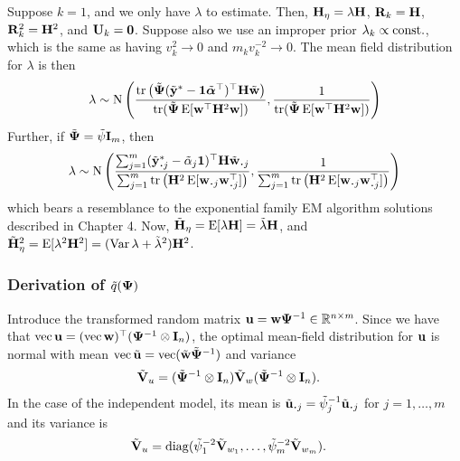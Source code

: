 \begin{example}
  Suppose $k=1$, and we only have $\lambda$ to estimate.
  Then, ${\mathbf H}_\eta = \lambda {\mathbf H}$, ${\mathbf R}_k = {\mathbf H}$, ${\mathbf R}_k^2 = {\mathbf H}^2$, and ${\mathbf U}_k = {\mathbf 0}$.
  Suppose also we use an improper prior $\lambda_k \propto \text{const.}\hspace{0.01em}$, which is the same as having $v_k^2 \to 0$ and $m_k v_k^{-2} \to 0$.
  The mean field distribution for $\lambda$ is then
  \[
    \lambda \sim \operatorname{N} \left( 
    \frac{\operatorname{tr}\big(\tilde{{\bm\Psi}}(\tilde{{\mathbf y}}^* - {\mathbf 1}\tilde{{\bm\alpha}}^\top)^\top {\mathbf H} \tilde{{\mathbf w}} \big)}{\operatorname{tr}(\tilde{{\bm\Psi}}\operatorname{E}[{\mathbf w}^\top{\mathbf H}^2{\mathbf w}])},
    \frac{1}{\operatorname{tr}(\tilde{{\bm\Psi}}\operatorname{E}[{\mathbf w}^\top{\mathbf H}^2{\mathbf w}])}
    \right)
  \]
  Further, if $\tilde{{\bm\Psi}} = \tilde\psi{\mathbf I}_m$, then
  \[
    \lambda \sim \N \left( 
    \frac{\sum_{j=1}^m (\tilde\by^*_{\bigcdot j} - \tilde\alpha_j\bone)^\top \bH \tilde\bw_{\bigcdot j} }{\sum_{j=1}^m
  \tr \big( \bH^2 \E [\bw_{\bigcdot j} \bw_{\bigcdot j}^\top] \big)},
    \frac{1}{\sum_{j=1}^m
  \tr \big( \bH^2 \E [\bw_{\bigcdot j} \bw_{\bigcdot j}^\top] \big)}
    \right)
  \]
  which bears a resemblance to the exponential family EM algorithm solutions described in Chapter 4.
  Now, $\tilde {{\mathbf H}}_\eta = \operatorname{E}[\lambda {\mathbf H}] = \tilde\lambda {\mathbf H}$, and $\tilde {{\mathbf H}}_\eta^2 = \operatorname{E}[\lambda^2 {\mathbf H}^2] = (\operatorname{Var}\lambda + \tilde\lambda^2) {\mathbf H}^2$.
\end{example}

\subsubsection[Derivation of q Psi]{Derivation of $\tilde q({\bm\Psi})$}

Introduce the transformed random matrix ${\mathbf u} = {\mathbf w}{\bm\Psi}^{-1} \in \mathbb{R}^{n\times m}$.
Since we have that  $\operatorname{vec} {\mathbf u} = (\operatorname{vec} {\mathbf w})^\top ({\bm\Psi}^{-1} \otimes {\mathbf I}_n)$, the optimal mean-field distribution for ${\mathbf u}$ is normal with mean $\operatorname{vec} \tilde{{\mathbf u}} = \operatorname{vec} (\tilde{{\mathbf w}}\tilde{{\bm\Psi}}^{-1} )$ and variance
\begin{align*}
  \tilde {{\mathbf V}}_u
  &= (\tilde{{\bm\Psi}}^{-1} \otimes {\mathbf I}_n) \tilde {{\mathbf V}}_w (\tilde{{\bm\Psi}}^{-1} \otimes {\mathbf I}_n). 
\end{align*}
In the case of the independent model, its mean is $\tilde\bu_{\bigcdot j} = \tilde\psi_j^{-1} \tilde\bu_{\bigcdot j}$ for $j=1,\dots,m$ and its variance is
\begin{align*}
  \tilde {{\mathbf V}}_u 
  &= \operatorname{diag}(\tilde\psi_1^{-2}\tilde{{\mathbf V}}_{w_1},\dots,\tilde\psi_m^{-2}\tilde{{\mathbf V}}_{w_m}).
\end{align*}

